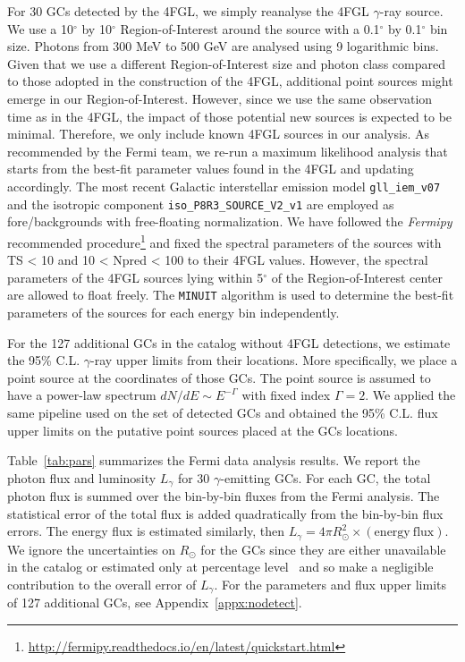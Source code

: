 \documentclass[doublespace,nopageskip]{VTthesis} %
\begin{document}
For 30 GCs detected by the 4FGL, we simply reanalyse the 4FGL $\gamma$-ray source. We use a 10$^{\circ}$ by 10$^{\circ}$ Region-of-Interest around the source with a 0.1$^{\circ}$ by 0.1$^{\circ}$ bin size. Photons from 300 MeV to 500 GeV are analysed using 9 logarithmic bins. Given that we use a different Region-of-Interest size and photon class compared to those adopted in the construction of the 4FGL, additional point sources might emerge in our Region-of-Interest. However, since we use the same observation time as in the 4FGL, the impact of those potential new sources is expected to be minimal. Therefore, we only include known 4FGL sources in our analysis. As recommended by the Fermi team, we re-run a maximum likelihood analysis that starts from the best-fit parameter values found in the 4FGL and updating accordingly. The most recent Galactic interstellar emission model \texttt{gll\_iem\_v07} and the isotropic component \texttt{iso\_P8R3\_SOURCE\_V2\_v1} are employed as fore/backgrounds with free-floating normalization. We have followed the \textit{Fermipy} recommended procedure\footnote{\url{http://fermipy.readthedocs.io/en/latest/quickstart.html}} and fixed the spectral parameters of the sources with TS < 10 and 10 < Npred < 100 to their 4FGL values. However, the spectral parameters of the 4FGL sources lying within 5$^{\circ}$ of the Region-of-Interest center are allowed to float freely. The \texttt{MINUIT} algorithm is used to determine the best-fit parameters of the sources for each energy bin independently.

For the 127 additional GCs in the \citet{1996AJ....112.1487H} catalog without 4FGL detections, we estimate the 95\% C.L. $\gamma$-ray upper limits from their locations. More specifically, we place a point source at the coordinates of those GCs. The point source is assumed to have a power-law spectrum $dN/dE\sim E^{-\Gamma}$ with fixed index $\Gamma = 2$. We applied the same pipeline used on the set of detected GCs and obtained the 95\% C.L. flux upper limits on the putative point sources placed at the GCs locations.

Table~\ref{tab:pars} summarizes the Fermi data analysis results. We report the photon flux and luminosity $L_\gamma$ for 30 $\gamma$-emitting GCs. For each GC, the total photon flux is summed over the bin-by-bin fluxes from the Fermi analysis. The statistical error of the total flux is added quadratically from the bin-by-bin flux errors. The energy flux is estimated similarly, then $L_\gamma = 4\pi R_\odot^2 \times (\mathrm{energy\ flux})$. We ignore the uncertainties on $R_\odot$ for the GCs since they are either unavailable in the \citet{1996AJ....112.1487H} catalog or estimated only at percentage level~\citep{2017MNRAS.464.2174B} and so make a negligible contribution to the overall error of $L_\gamma$. For the parameters and flux upper limits of 127 additional GCs, see Appendix~\ref{appx:nodetect}.
\end{document}
